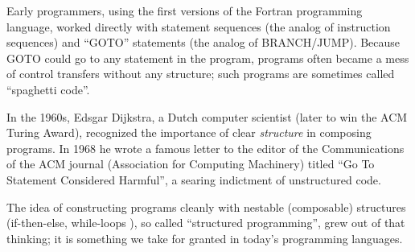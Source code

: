 Early programmers, {\eg} using the first versions of the Fortran
programming language, worked directly with statement sequences (the
analog of instruction sequences) and ``GOTO'' statements (the analog
of BRANCH/JUMP).  Because GOTO could go to any statement in the
program, programs often became a mess of control transfers without any
structure; such programs are sometimes called ``spaghetti code''.

In the 1960s, Edsgar Dijkstra, a Dutch computer scientist (later to
win the ACM Turing Award), recognized the importance of clear
\emph{structure} in composing programs.  In 1968 he wrote a famous
letter to the editor of the Communications of the ACM journal
(Association for Computing Machinery) titled ``Go To Statement
Considered Harmful'', a searing indictment of unstructured code.

The idea of constructing programs cleanly with nestable (composable)
structures (if-then-else, while-loops {\etc}), so called ``structured
programming'', grew out of that thinking; it is something we take for
granted in today's programming languages.

